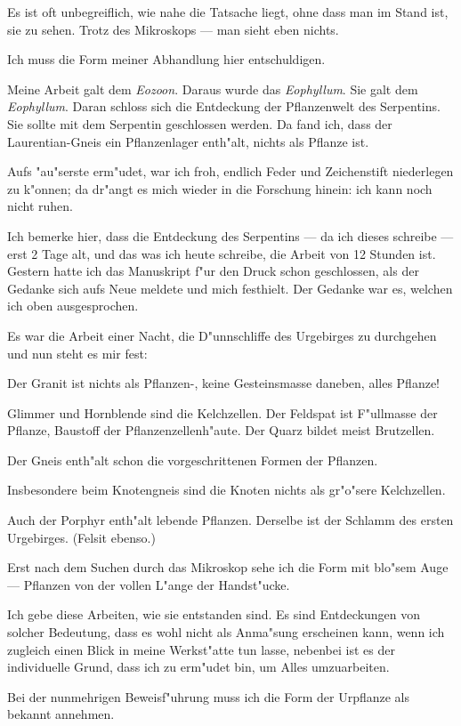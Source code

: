 \documentclass[a4paper, 11pt, oneside, german]{article}
\begin{document}
Es ist oft unbegreiflich, wie nahe die Tatsache liegt, ohne dass man im Stand ist, sie zu sehen. Trotz des Mikroskops --- man sieht eben nichts.

Ich muss die Form meiner Abhandlung hier entschuldigen.

Meine Arbeit galt dem \emph{Eozoon}. Daraus wurde das \emph{Eophyllum}. Sie galt dem \emph{Eophyllum}. Daran schloss sich die Entdeckung der Pflanzenwelt des Serpentins. Sie sollte mit dem Serpentin geschlossen werden. Da fand ich, dass der Laurentian-Gneis ein Pflanzenlager enth"alt, nichts als Pflanze ist.

Aufs "au"serste erm"udet, war ich froh, endlich Feder und Zeichenstift niederlegen zu k"onnen; da dr"angt es mich wieder in die Forschung hinein: ich kann noch nicht ruhen.

Ich bemerke hier, dass die Entdeckung des Serpentins --- da ich dieses schreibe --- erst 2 Tage alt, und das was ich heute schreibe, die Arbeit von 12 Stunden ist. Gestern hatte ich das Manuskript f"ur den Druck schon geschlossen, als der Gedanke sich aufs Neue meldete und mich festhielt. Der Gedanke war es, welchen ich oben ausgesprochen.

Es war die Arbeit einer Nacht, die D"unnschliffe des Urgebirges zu durchgehen und nun steht es mir fest:

Der Granit ist nichts als Pflanzen-, keine Gesteinsmasse daneben, alles Pflanze!

Glimmer und Hornblende sind die Kelchzellen. Der Feldspat ist F"ullmasse der Pflanze, Baustoff der Pflanzenzellenh"aute. Der Quarz bildet meist Brutzellen.

Der Gneis enth"alt schon die vorgeschrittenen Formen der Pflanzen.

Insbesondere beim Knotengneis sind die Knoten nichts als gr"o"sere Kelchzellen.

Auch der Porphyr enth"alt lebende Pflanzen. Derselbe ist der Schlamm des ersten Urgebirges. (Felsit ebenso.)

Erst nach dem Suchen durch das Mikroskop sehe ich die Form mit blo"sem Auge --- Pflanzen von der vollen L"ange der Handst"ucke.

Ich gebe diese Arbeiten, wie sie entstanden sind. Es sind Entdeckungen von solcher Bedeutung, dass es wohl nicht als Anma"sung erscheinen kann, wenn ich zugleich einen Blick in meine Werkst"atte tun lasse, nebenbei ist es der individuelle Grund, dass ich zu erm"udet bin, um Alles umzuarbeiten.

Bei der nunmehrigen Beweisf"uhrung muss ich die Form der Urpflanze als bekannt annehmen.
\end{document}
